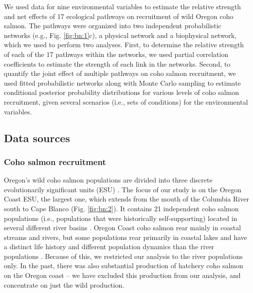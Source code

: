 We used data for nine environmental variables to estimate the relative strength
and net effects of 17 ecological pathways on recruitment of wild Oregon coho
salmon. The pathways were organized into two independent probabilistic networks
(e.g., Fig. \ref{fig:bn:1}c), a physical network and a biophysical network, which we used to
perform two analyses. First, to determine the relative strength of each of the
17 pathways within the networks, we used partial correlation coefficients to
estimate the strength of each link in the networks. Second, to quantify the
joint effect of multiple pathways on coho salmon recruitment, we used fitted
probabilistic networks along with Monte Carlo sampling to estimate conditional
posterior probability distributions for various levels of coho salmon
recruitment, given several scenarios (i.e., sets of conditions) for the
environmental variables.


\subsection{Data sources}

\subsubsection{Coho salmon recruitment}

Oregon's wild coho salmon populations are divided into three discrete
evolutionarily significant units (ESU) \citep{Weitkamp1995a, Lawson2007a}. The
focus of our study is on the Oregon Coast ESU, the largest one, which extends
from the mouth of the Columbia River south to Cape Blanco (Fig. \ref{fig:bn:2}). It contains
21 independent coho salmon populations (i.e., populations that were historically
self-supporting) located in several different river basins \citep{Lawson2007a}.
Oregon Coast coho salmon rear mainly in coastal streams and rivers, but some
populations rear primarily in coastal lakes and have a distinct life history and
different population dynamics than the river populations \citep{Lawson2004,
PFMC2013}. Because of this, we restricted our analysis to the river populations
only. In the past, there was also substantial production of hatchery coho salmon
on the Oregon coast -- we have excluded this production from our analysis, and
concentrate on just the wild production.

